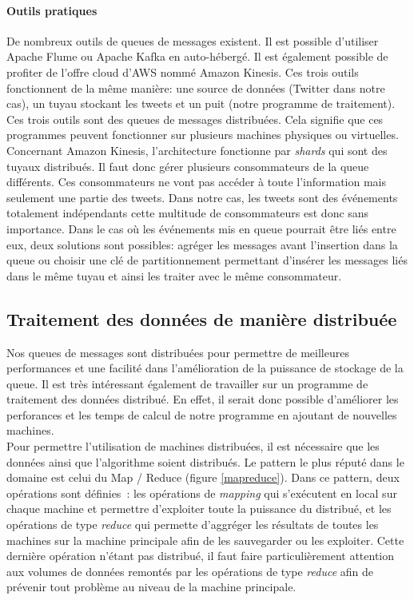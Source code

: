   \paragraph{Outils pratiques}
  \label{par:Outils pratiques}
  De nombreux outils de queues de messages existent. Il est possible d'utiliser Apache Flume ou Apache Kafka en auto-hébergé. Il est également possible de profiter de l'offre cloud d'AWS nommé Amazon Kinesis. Ces trois outils fonctionnent de la même manière: une source de données (Twitter dans notre cas), un tuyau stockant les tweets et un puit (notre programme de traitement).\\

  Ces trois outils sont des queues de messages distribuées. Cela signifie que ces programmes peuvent fonctionner sur plusieurs machines physiques ou virtuelles. Concernant Amazon Kinesis, l'architecture fonctionne par \textit{shards} qui sont des tuyaux distribués. Il faut donc gérer plusieurs consommateurs de la queue différents. Ces consommateurs ne vont pas accéder à toute l'information mais seulement une partie des tweets. Dans notre cas, les tweets sont des événements totalement indépendants cette multitude de consommateurs est donc sans importance. Dans le cas où les événements mis en queue pourrait être liés entre eux, deux solutions sont possibles: agréger les messages avant l'insertion dans la queue ou choisir une clé de partitionnement permettant d'insérer les messages liés dans le même tuyau et ainsi les traiter avec le même consommateur.

\subsection{Traitement des données de manière distribuée}
\label{sub:Traitement des données de manière distribuée}

  Nos queues de messages sont distribuées pour permettre de meilleures performances et une facilité dans l'amélioration de la puissance de stockage de la queue. Il est très intéressant également de travailler sur un programme de traitement des données distribué. En effet, il serait donc possible d'améliorer les perforances et les temps de calcul de notre programme en ajoutant de nouvelles machines.\\

  Pour permettre l'utilisation de machines distribuées, il est nécessaire que les données ainsi que l'algorithme soient distribués. Le pattern le plus réputé dans le domaine est celui du Map / Reduce (figure \ref{mapreduce}). Dans ce pattern, deux opérations sont définies : les opérations de \textit{mapping} qui s'exécutent en local sur chaque machine et permettre d'exploiter toute la puissance du distribué, et les opérations de type \textit{reduce} qui permette d'aggréger les résultats de toutes les machines sur la machine principale afin de les sauvegarder ou les exploiter. Cette dernière opération n'étant pas distribué, il faut faire particulièrement attention aux volumes de données remontés par les opérations de type \textit{reduce} afin de prévenir tout problème au niveau de la machine principale.

